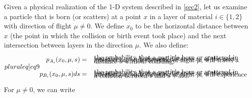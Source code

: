 \documentclass[12pt]{article}
\begin{document}
Given a physical realization of the 1-D system described in \cref{sec2}, let us examine a particle that is born (or scatters) at a point $x$ in a layer of material $i \in \{1,2\}$ with direction of flight $\mu\neq 0$.
We define $x_0$ to be the horizontal distance between $x$ (the point in which the collision or birth event took place) and the next intersection between layers in the direction $\mu$.
We also define:
\begin{subequations}\label[pluraleq]{eq9}
\begin{align}
p_{A_i}(x_0,\mu,s) &= \begin{array}{l}
\text{ the probability that a particle born or scattered in}\vspace{-10pt}\\
\text{ material $i$, at a horizontal distance $x_0$ of the next}\vspace{-10pt}\\
\text{ intersection, with direction of flight $\mu$, will travel a}\vspace{-10pt}\\
\text{ distance $s$ without colliding;}
\end{array}
\\
p_{B_i}(x_0,\mu,s)ds &= \begin{array}{l}
\text{ the probability that a particle born or scattered in}\vspace{-10pt}\\
\text{ material $i$, at a horizontal distance $x_0$ of the next}\vspace{-10pt}\\
\text{ intersection, with direction of flight $\mu$, will experience}\vspace{-10pt}\\
\text{  a collision between $s$ and $s+ds$.}
\end{array}
\end{align}
\end{subequations}
For $\mu\neq 0$, we can write
\end{document}
